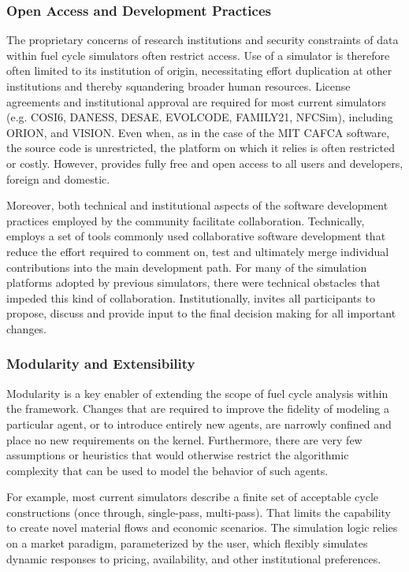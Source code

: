 
\subsubsection{Open Access and Development Practices}

The proprietary concerns of research institutions and security constraints of
data within fuel cycle simulators often restrict access. Use of a simulator is
therefore often limited to its institution of origin, necessitating effort
duplication at other institutions and thereby squandering broader human
resources. License agreements and institutional approval are required for most
current simulators (e.g. \gls{COSI}6, \gls{DANESS}, \gls{DESAE}, EVOLCODE,
FAMILY21, \gls{NFCSim})\cite{juchau_modeling_2010}, including ORION,
and \gls{VISION}.  Even when, as in the case of the MIT \gls{CAFCA} software,
the source code is unrestricted, the platform on which it relies is often
restricted or costly.  However, \Cyclus provides fully free and open access to
all users and developers, foreign and domestic.

Moreover, both technical and institutional aspects of the software development
practices employed by the \Cyclus community facilitate collaboration.
Technically, \Cyclus employs a set of tools commonly used collaborative
software development that reduce the effort required to comment on, test and
ultimately merge individual contributions into the main development path.
For many of the simulation platforms adopted by previous simulators, there were
technical obstacles that impeded this kind of collaboration.
Institutionally, \Cyclus invites all participants to propose, discuss and
provide input to the final decision making for all important changes.

\subsubsection{Modularity and Extensibility}

Modularity is a key enabler of extending the scope of fuel cycle analysis
within the \Cyclus framework.  Changes that are required to improve the
fidelity of modeling a particular agent, or to introduce entirely new agents,
are narrowly confined and place no new requirements on the \Cyclus kernel.
Furthermore, there are very few assumptions or heuristics that would otherwise
restrict the algorithmic complexity that can be used to model the behavior of
such agents.

For example, most current simulators describe a finite set of acceptable cycle
constructions (once through, single-pass, multi-pass). That limits the
capability to create novel material flows and economic scenarios. The \Cyclus
simulation logic relies on a market paradigm, parameterized by the user, which
flexibly simulates dynamic responses to pricing, availability, and other
institutional preferences.

